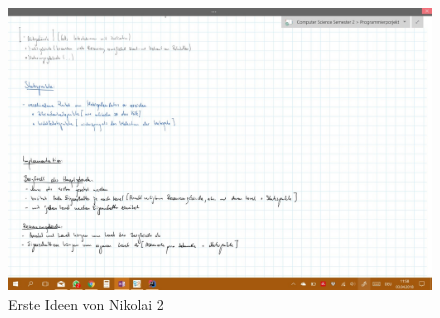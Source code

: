 \documentclass{scrartcl}
\begin{document}
\begin{figure}[H]
	\includegraphics[width=\linewidth]{Idee2.jpg}
	\caption{Erste Ideen von Nikolai 2}
	\label{fig:map1}
\end{figure}
\end{document}
